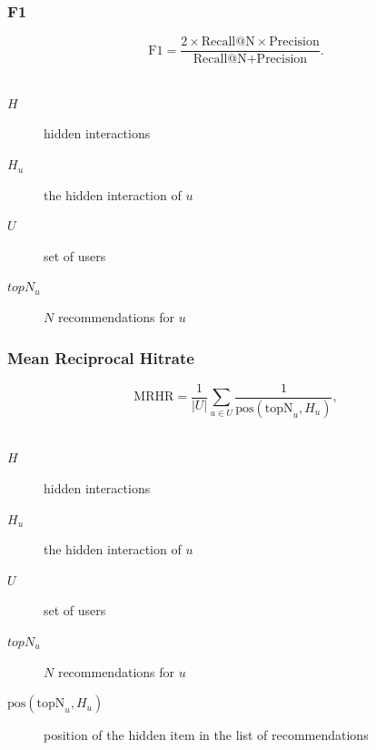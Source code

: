 \documentclass[mathserif,svgnames]{beamer}
\begin{document}
\begin{frame} 
    \frametitle{F1~\cite{Sarwar00applicationof}}
\begin{equation} 
\text{F1}=\frac{2 \times \text{Recall@N} \times 
\text{Precision}}{\text{Recall@N} + \text{Precision}}.
\end{equation}\\
\vspace{6.4mm}
\begin{description}
    \item[$H$] hidden interactions\\
    \item[$H_u$] the hidden interaction of $u$\\
    \item[$U$] set of users
    \item[$topN_u$] $N$ recommendations for $u$
\end{description}
\end{frame}

\begin{frame} 
    \frametitle{Mean Reciprocal Hitrate~\cite{DBLP:conf/icdm/NingK11}}
\begin{equation} 
\text{MRHR}=\frac{1}{|U|} \sum_{u \in U} \frac{1}{\text{pos}(\text{topN}_{u},H_{u})},
\end{equation}\\
\vspace{6.4mm}
\begin{description}
    \item[$H$] hidden interactions\\
    \item[$H_u$] the hidden interaction of $u$\\
    \item[$U$] set of users
    \item[$topN_u$] $N$ recommendations for $u$
    \item[$\text{pos}(\text{topN}_{u},H_{u})$] position of the hidden item in the list of recommendations
\end{description}
\end{frame}
\end{document}
